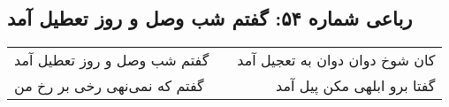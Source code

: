 \begin{center}
\section*{رباعی شماره ۵۴: گفتم شب وصل و روز تعطیل آمد}
\label{sec:054}
\begin{longtable}{l p{0.5cm} r}
گفتم شب وصل و روز تعطیل آمد
&&
کان شوخ دوان دوان به تعجیل آمد
\\
گفتم که نمی‌نهی رخی بر رخ من
&&
گفتا برو ابلهی مکن پیل آمد
\\
\end{longtable}
\end{center}
